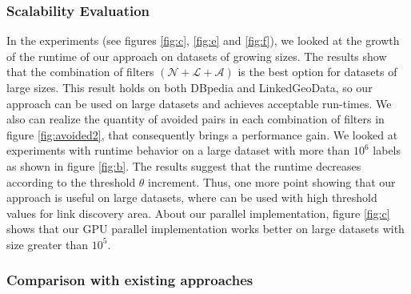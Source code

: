 
\subsubsection{Scalability Evaluation}

In the experiments (see figures \ref{fig:c}, \ref{fig:e} and \ref{fig:f}), we looked at the growth of the runtime of our approach on datasets of growing sizes.
The results show that the combination of filters $(\mathcal{N}+\mathcal{L}+\mathcal{A})$ is the best option for datasets of large sizes.
This result holds on both DBpedia and LinkedGeoData, so our approach can be used on large datasets and achieves acceptable run-times. 
We also can realize the quantity of avoided pairs in each combination of filters in figure \ref{fig:avoided2}, that consequently brings a performance gain.
We looked at experiments with runtime behavior on a large dataset with more than $10^6$ labels as shown in figure \ref{fig:b}. The results suggest that the runtime decreases according to the threshold $\theta$ increment. Thus, one more point showing that our approach is useful on large datasets, where can be used with high threshold values for link discovery area.
About our parallel implementation, figure \ref{fig:c} shows that our GPU parallel implementation works better on large datasets with size greater than $10^5$. 

\subsubsection{Comparison with existing approaches} \label{comparisons}

